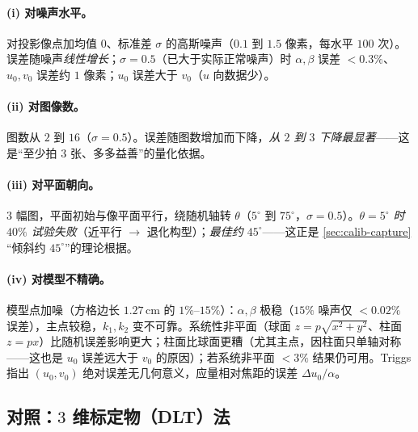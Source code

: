 \paragraph{(i) 对噪声水平。}
对投影像点加均值 $0$、标准差 $\sigma$ 的高斯噪声（$0.1$ 到 $1.5$ 像素，每水平 $100$ 次）。误差随噪声\emph{线性增长}；$\sigma=0.5$（已大于实际正常噪声）时 $\alpha,\beta$ 误差 $<0.3\%$、$u_0,v_0$ 误差约 $1$ 像素；$u_0$ 误差大于 $v_0$（$u$ 向数据少）。

\paragraph{(ii) 对图像数。}
图数从 $2$ 到 $16$（$\sigma=0.5$）。误差随图数增加而下降，\emph{从 $2$ 到 $3$ 下降最显著}——这是“至少拍 $3$ 张、多多益善”的量化依据。

\paragraph{(iii) 对平面朝向。}
$3$ 幅图，平面初始与像平面平行，绕随机轴转 $\theta$（$5^\circ$ 到 $75^\circ$，$\sigma=0.5$）。\emph{$\theta=5^\circ$ 时 $40\%$ 试验失败}（近平行 $\to$ 退化构型）；\emph{最佳约 $45^\circ$}——这正是 \cref{sec:calib-capture} “倾斜约 $45^\circ$”的理论根据。

\paragraph{(iv) 对模型不精确。}
模型点加噪（方格边长 $1.27\,\mathrm{cm}$ 的 $1\%$--$15\%$）：$\alpha,\beta$ 极稳（$15\%$ 噪声仅 $<0.02\%$ 误差），主点较稳，$k_1,k_2$ 变不可靠。系统性非平面（球面 $z=p\sqrt{x^2+y^2}$、柱面 $z=px$）比随机误差影响更大；柱面比球面更糟（尤其主点，因柱面只单轴对称——这也是 $u_0$ 误差远大于 $v_0$ 的原因）；若系统非平面 $<3\%$ 结果仍可用。Triggs\cite{triggs1998autocalib} 指出 $(u_0,v_0)$ 绝对误差无几何意义，应量相对焦距的误差 $\Delta u_0/\alpha$。

\subsection{对照：\texorpdfstring{$3$}{3} 维标定物（DLT）法}

